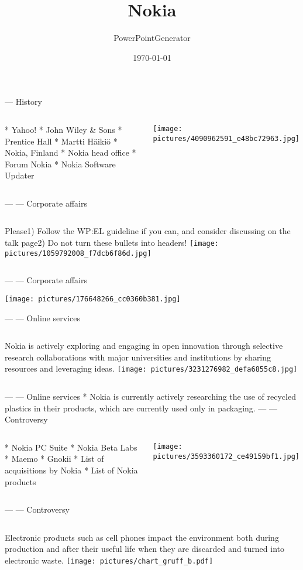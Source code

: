 \documentclass{beamer}
\date{\today}
\title{Nokia}
\author{PowerPointGenerator}
\begin{document}
\frame{\titlepage}
--- History
\begin{columns}
 * Yahoo!
 * John Wiley \& Sons
 * Prentice Hall
 * Martti H\"aiki\"o
 * Nokia, Finland
 * Nokia head office
 * Forum Nokia
 * Nokia Software Updater

\texttt{[image: pictures/4090962591\_e48bc72963.jpg]}
\end{columns}
---
--- Corporate affairs
\begin{columns}
Please1) Follow the WP:EL guideline if you can, and consider discussing on the talk page2) Do not turn these bullets into headers!
\texttt{[image: pictures/1059792008\_f7dcb6f86d.jpg]}
\end{columns}
---
--- Corporate affairs
\begin{center}
\texttt{[image: pictures/176648266\_cc0360b381.jpg]}\end{center}
---
--- Online services
\begin{columns}
Nokia is actively exploring and engaging in open innovation through selective research collaborations with major universities and institutions by sharing resources and leveraging ideas.
\texttt{[image: pictures/3231276982\_defa6855c8.jpg]}
\end{columns}
---
--- Online services
 * Nokia is currently actively researching the use of recycled plastics in their products, which are currently used only in packaging.
---
--- Controversy
\begin{columns}
 * Nokia PC Suite
 * Nokia Beta Labs
 * Maemo
 * Gnokii
 * List of acquisitions by Nokia
 * List of Nokia products

\texttt{[image: pictures/3593360172\_ce49159bf1.jpg]}
\end{columns}
---
--- Controversy
\begin{columns}
Electronic products such as cell phones impact the environment both during production and after their useful life when they are discarded and turned into electronic waste.
\texttt{[image: pictures/chart\_gruff\_b.pdf]}
\end{columns}
\end{document}
